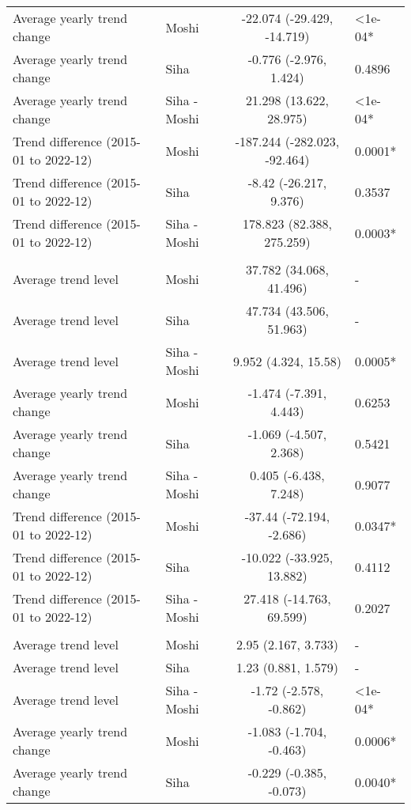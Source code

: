 \begin{longtable}{l|lcl}
Average yearly trend change & Moshi & -22.074 (-29.429, -14.719) & <1e-04* \\ 
Average yearly trend change & Siha & -0.776 (-2.976, 1.424) & 0.4896 \\ 
Average yearly trend change & Siha - Moshi & 21.298 (13.622, 28.975) & <1e-04* \\ 
Trend difference (2015-01 to 2022-12) & Moshi & -187.244 (-282.023, -92.464) & 0.0001* \\ 
Trend difference (2015-01 to 2022-12) & Siha & -8.42 (-26.217, 9.376) & 0.3537 \\ 
Trend difference (2015-01 to 2022-12) & Siha - Moshi & 178.823 (82.388, 275.259) & 0.0003* \\ 
\midrule\addlinespace[2.5pt]
\multicolumn{4}{l}{Road Traffic Accidents} \\[2.5pt] 
\midrule\addlinespace[2.5pt]
Average trend level & Moshi & 37.782 (34.068, 41.496) & - \\ 
Average trend level & Siha & 47.734 (43.506, 51.963) & - \\ 
Average trend level & Siha - Moshi & 9.952 (4.324, 15.58) & 0.0005* \\ 
Average yearly trend change & Moshi & -1.474 (-7.391, 4.443) & 0.6253 \\ 
Average yearly trend change & Siha & -1.069 (-4.507, 2.368) & 0.5421 \\ 
Average yearly trend change & Siha - Moshi & 0.405 (-6.438, 7.248) & 0.9077 \\ 
Trend difference (2015-01 to 2022-12) & Moshi & -37.44 (-72.194, -2.686) & 0.0347* \\ 
Trend difference (2015-01 to 2022-12) & Siha & -10.022 (-33.925, 13.882) & 0.4112 \\ 
Trend difference (2015-01 to 2022-12) & Siha - Moshi & 27.418 (-14.763, 69.599) & 0.2027 \\ 
\midrule\addlinespace[2.5pt]
\multicolumn{4}{l}{Schistosomiasis} \\[2.5pt] 
\midrule\addlinespace[2.5pt]
Average trend level & Moshi & 2.95 (2.167, 3.733) & - \\ 
Average trend level & Siha & 1.23 (0.881, 1.579) & - \\ 
Average trend level & Siha - Moshi & -1.72 (-2.578, -0.862) & <1e-04* \\ 
Average yearly trend change & Moshi & -1.083 (-1.704, -0.463) & 0.0006* \\ 
Average yearly trend change & Siha & -0.229 (-0.385, -0.073) & 0.0040* \\ 

\end{longtable}
